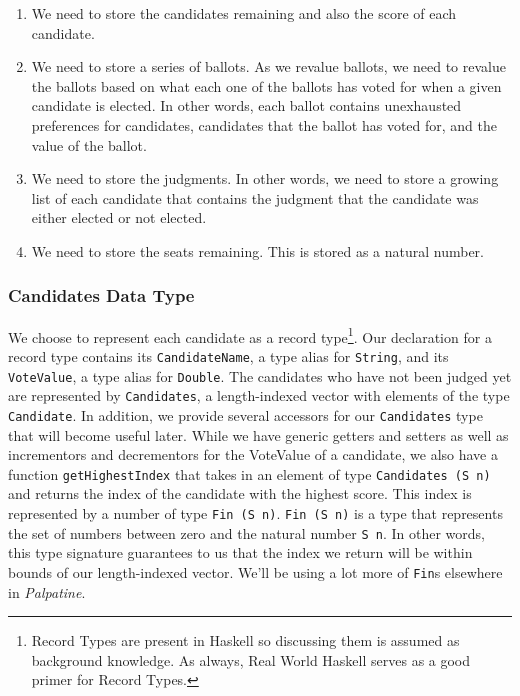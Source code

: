 \begin{enumerate}
	\item We need to store the candidates remaining and also the score of each
	      candidate.
	\item We need to store a series of ballots. As we revalue ballots, we need
	      to revalue the ballots based on what each one of the ballots has voted for
	      when a given candidate is elected. In other words, each ballot contains
	      unexhausted preferences for candidates, candidates that the ballot has voted
	      for, and the value of the ballot.
	\item We need to store the judgments. In other words, we need to store a
	      growing list of each candidate that contains the judgment that the candidate
	      was either elected or not elected.
	\item We need to store the seats remaining. This is stored as a natural
	number. 
\end{enumerate}

\subsubsection{Candidates Data Type}

We choose to represent each candidate as a record type\footnote{Record Types are
	present in Haskell so discussing them is assumed as background knowledge. As
	always, Real World Haskell serves as a good primer for Record Types. }. Our
declaration for a record type contains its \texttt{CandidateName}, a type alias
for \texttt{String}, and its \texttt{VoteValue}, a type alias for
\texttt{Double}. The candidates who have not been judged yet are represented by
\texttt{Candidates}, a length-indexed vector with elements of the type
\texttt{Candidate}. In addition, we provide several accessors for our
\texttt{Candidates} type that will become useful later. While we have generic
getters and setters as well as incrementors and decrementors for the VoteValue
of a candidate, we also have a function \texttt{getHighestIndex} that takes in
an element of type \texttt{Candidates (S n)} and returns the index of the
candidate with the highest score. This index is represented by a number of type
\texttt{Fin (S n)}. \texttt{Fin (S n)} is a type that represents the set of
numbers between zero and the natural number \texttt{S n}. In other words, this
type signature guarantees to us that the index we return will be within bounds
of our length-indexed vector. We'll be using a lot more of \texttt{Fin}s
elsewhere in \textit{Palpatine}.

